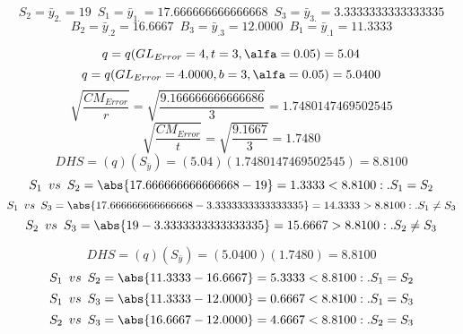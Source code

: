 $$S_{2}=\bar{y}_{2.}=19 \enspace S_{1}=\bar{y}_{1.}=17.666666666666668 \enspace S_{3}=\bar{y}_{3.}=3.3333333333333335$$
$$B_{2}=\bar{y}_{.2}=16.6667 \enspace B_{3}=\bar{y}_{.3}=12.0000 \enspace B_{1}=\bar{y}_{.1}=11.3333$$

$$q=q(GL_{Error}=4, t=3, \alfa=0.05)=5.04$$
$$q=q(GL_{Error}=4.0000, b=3, \alfa=0.05)=5.0400$$
$$\sqrt{\frac{CM_{Error}}{r}}=\sqrt{\frac{9.166666666666686}{3}}=1.7480147469502545$$
$$\sqrt{\frac{CM_{Error}}{t}}=\sqrt{\frac{9.1667}{3}}=1.7480$$
$$DHS=(q)(S_{\bar{y}})=(5.04)(1.7480147469502545)=8.8100$$
$$S_{1} \enspace vs \enspace S_{2} = \abs{17.666666666666668-19}=1.3333<8.8100:.S_{1}=S_{2}$$
$$S_{1} \enspace vs \enspace S_{3} = \abs{17.666666666666668-3.3333333333333335}=14.3333>8.8100:.S_{1}\not=S_{3}$$
$$S_{2} \enspace vs \enspace S_{3} = \abs{19-3.3333333333333335}=15.6667>8.8100:.S_{2}\not=S_{3}$$

$$DHS=(q)(S_{\bar{y}})=(5.0400)(1.7480)=8.8100$$
$$S_{1} \enspace vs \enspace S_{2} = \abs{11.3333-16.6667}=5.3333<8.8100:.S_{1}=S_{2}$$
$$S_{1} \enspace vs \enspace S_{3} = \abs{11.3333-12.0000}=0.6667<8.8100:.S_{1}=S_{3}$$
$$S_{2} \enspace vs \enspace S_{3} = \abs{16.6667-12.0000}=4.6667<8.8100:.S_{2}=S_{3}$$
